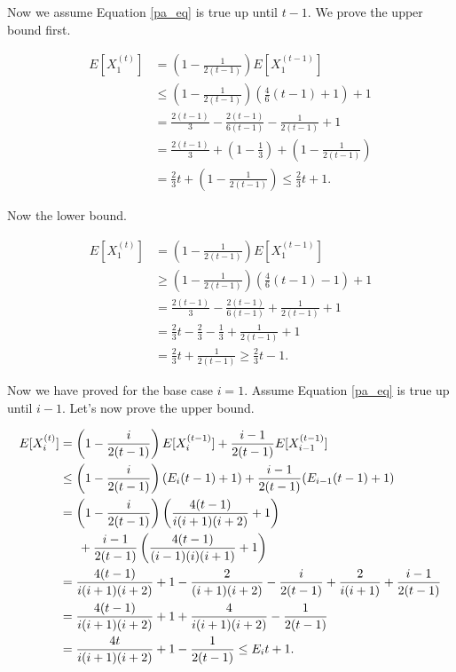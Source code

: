 Now we assume Equation \ref{pa_eq} is true up until $t-1$. We prove the upper bound first.

\begin{align}
E[X_1^{(t)}] &= \left(1 - \frac{1}{2(t-1)}\right)E[X_1^{(t-1)}]\\
&\leq \left(1 - \frac{1}{2(t-1)}\right)\left(\frac{4}{6}(t-1) + 1\right) + 1\tag{By inductive hypotesis}\\
&=\frac{2(t-1)}{3} -\frac{2(t-1)}{6(t-1)} - \frac{1}{2(t-1)} + 1\\
&=\frac{2(t-1)}{3} + \left(1 - \frac{1}{3}\right) + \left(1 - \frac{1}{2(t-1)}\right)\\
&=\frac{2}{3}t + \left(1 -\frac{1}{2(t-1)}\right) \leq \frac{2}{3}t + 1.
\end{align}

Now the lower bound.


\begin{align}
E[X_1^{(t)}] &= \left(1 - \frac{1}{2(t-1)}\right)E[X_1^{(t-1)}]\\
&\geq \left(1 - \frac{1}{2(t-1)}\right)\left(\frac{4}{6}(t-1) - 1\right) + 1\tag{By inductive hypotesis} \\
&=\frac{2(t-1)}{3} -\frac{2(t-1)}{6(t-1)} + \frac{1}{2(t-1)} + 1\\
&=\frac{2}{3}t - \frac{2}{3} -\frac{1}{3} + \frac{1}{2(t-1)} + 1\\
&=\frac{2}{3}t + \frac{1}{2(t-1)} \geq \frac{2}{3}t - 1.
\end{align}

Now we have proved for the base case $i = 1$. Assume Equation \ref{pa_eq} is true up until $i-1$. Let's now prove the upper bound.

\begin{align}
E[X_i^{(t)}] &= \left(1-\frac{i}{2(t-1)}\right)E[X_i^{(t-1)}] +\frac{i -1}{2(t-1)}E[X_{i-1}^{(t-1)}]\\
&\leq \left(1-\frac{i}{2(t-1)}\right)(E_i(t-1)+1) +\frac{i -1}{2(t-1)}(E_{i-1}(t-1)+1)\\
&=\left(1-\frac{i}{2(t-1)}\right)\left(\frac{4(t-1)}{i(i+1)(i+2)}+1\right)\\
&\indent+\frac{i -1}{2(t-1)}\left(\frac{4(t-1)}{(i-1)(i)(i+1)}+1\right)\\
&=\frac{4(t-1)}{i(i+1)(i+2)} + 1 -\frac{2}{(i+1)(i+2)} -\frac{i}{2(t-1)} + \frac{2}{i(i+1)} + \frac{i-1}{2(t-1)}\\
&=\frac{4(t-1)}{i(i+1)(i+2)} + 1 +\frac{4}{i(i+1)(i+2)} -\frac{1}{2(t-1)}\\
&=\frac{4t}{i(i+1)(i+2)} + 1 -\frac{1}{2(t-1)} \leq E_it+1.
\end{align}

